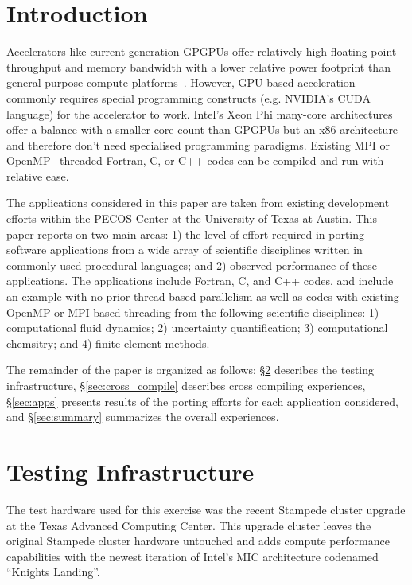 \section{Introduction}
\label{sec:intro}

Accelerators like current generation GPGPUs offer relatively high
floating-point throughput and memory bandwidth with a lower relative power
footprint than general-purpose compute platforms~\cite{gpu_hpc:2009}. However,
GPU-based acceleration commonly requires special programming constructs (e.g.
NVIDIA's CUDA language) for the accelerator to work.  Intel's Xeon Phi
many-core architectures offer a balance with a smaller core count than GPGPUs
but an x86 architecture and therefore don't need specialised programming
paradigms.  Existing MPI or OpenMP~\cite{openmp_standard} threaded Fortran, C,
or C++ codes can be compiled and run with relative ease.

The applications considered in this paper are taken from existing development
efforts within the PECOS Center at the University of Texas at Austin.  This
paper reports on two main areas: 1) the level of effort required in porting
software applications from a wide array of scientific disciplines written in
commonly used procedural languages; and 2) observed performance of these
applications.  The applications include Fortran, C, and C++ codes, and include
an example with no prior thread-based parallelism as well as codes with
existing OpenMP or MPI based threading from the following scientific
disciplines: 1) computational fluid dynamics; 2) uncertainty quantification;
3) computational chemsitry; and 4) finite element methods.

The remainder of the paper is organized as follows: \S\ref{sec:hardware}
describes the testing infrastructure, \S\ref{sec:cross_compile} describes cross
compiling experiences, \S\ref{sec:apps} presents results of the porting efforts
for each application considered, and \S\ref{sec:summary} summarizes the overall
experiences.

\section{Testing Infrastructure}
\label{sec:hardware}

The test hardware used for this exercise was the recent Stampede cluster
upgrade at the Texas Advanced Computing Center.  This upgrade cluster leaves
the original Stampede cluster hardware untouched and adds compute performance
capabilities with the newest iteration of Intel's MIC architecture codenamed
``Knights Landing''.

